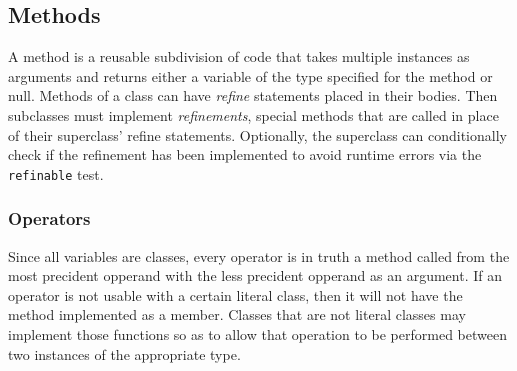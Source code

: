 \subsection{Methods}
A method is a reusable subdivision of code that takes multiple instances as arguments and returns either a variable of the type specified for the method or null. Methods of a class can have \textit{refine} statements placed in their bodies. Then subclasses must implement \textit{refinements}, special methods that are called in place of their superclass' refine statements. Optionally, the superclass can conditionally check if the refinement has been implemented to avoid runtime errors via the \verb!refinable! test.

\subsubsection{Operators}
Since all variables are classes, every operator is in truth a method called from the most precident opperand with the less precident opperand as an argument. If an operator is not usable with a certain literal class, then it will not have the method implemented as a member. Classes that are not literal classes may implement those functions so as to allow that operation to be performed between two instances of the appropriate type.
